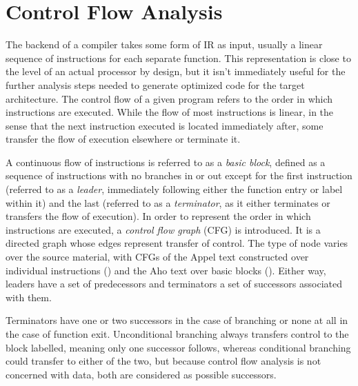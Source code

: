 \documentclass{article}
\begin{document}

\section{Control Flow Analysis}



The backend of a compiler takes some form of IR as input, usually a linear sequence of instructions for each separate function. This representation is close to the level of an actual processor by design, but it isn't immediately useful for the further analysis steps needed to generate optimized code for the target architecture. %
The control flow of a given program refers to the order in which instructions are executed. While the flow of most instructions is linear, in the sense that the next instruction executed is located immediately after, some transfer the flow of execution elsewhere or terminate it. %


A continuous flow of instructions is referred to as a \textit{basic block}, defined as a sequence of instructions with no branches in or out except for the first instruction (referred to as a \textit{leader}, immediately following either the function entry or label within it) and the last (referred to as a \textit{terminator}, as it either terminates or transfers the flow of execution). %
In order to represent the order in which instructions are executed, a \textit{control flow graph} (CFG) is introduced. It is a directed graph whose edges represent transfer of control. The type of node varies over the source material, with CFGs of the Appel text constructed over individual instructions (\cite{tiger}) and the Aho text over basic blocks (\cite{dragon}).
Either way, leaders have a set of predecessors and terminators a set of successors associated with them.

Terminators have one or two successors in the case of branching or none at all in the case of function exit. %
Unconditional branching always transfers control to the block labelled, meaning only one successor follows, whereas conditional branching could transfer to either of the two, but because control flow analysis is not concerned with data, both are considered as possible successors. %
\end{document}
